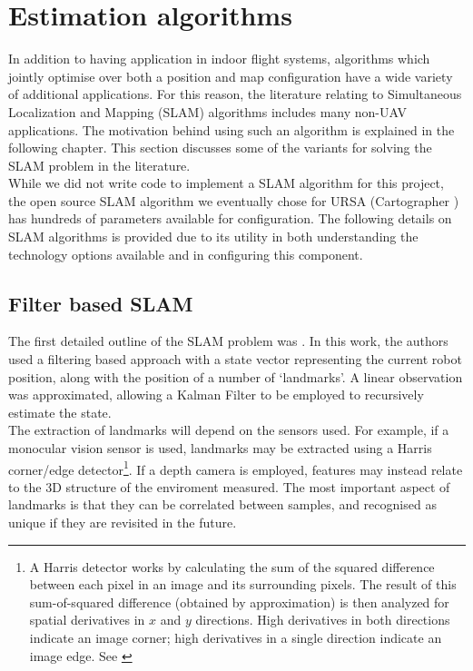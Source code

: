 \documentclass[capstone_report.tex]{subfiles}
\begin{document}
\section{Estimation algorithms}
In addition to having application in indoor flight systems, algorithms which jointly optimise over both a position and map configuration have a wide variety of additional applications. For this reason, the literature relating to Simultaneous Localization and Mapping (SLAM) algorithms includes many non-UAV applications. The motivation behind using such an algorithm is explained in the following chapter. This section discusses some of the variants for solving the SLAM problem in the literature.\\

While we did not write code to implement a SLAM algorithm for this project, the open source SLAM algorithm we eventually chose for URSA (Cartographer \cite{cart}) has hundreds of parameters available for configuration. The following details on SLAM algorithms is provided due to its utility in both understanding the technology options available and in configuring this component.

\subsection{Filter based SLAM}
The first detailed outline of the SLAM problem was \cite{smithcheese}. In this work, the authors used a filtering based approach with a state vector representing the current robot position, along with the position of a number of `landmarks'. A linear observation was approximated, allowing a Kalman Filter to be employed to recursively estimate the state.\\

The extraction of landmarks will depend on the sensors used. For example, if a monocular vision sensor is used, landmarks may be extracted using a Harris corner/edge detector\footnote{A Harris detector works by calculating the sum of the squared difference between each pixel in an image and its surrounding pixels. The result of this sum-of-squared difference (obtained by approximation) is then analyzed for spatial derivatives in $x$ and $y$ directions. High derivatives in both directions indicate an image corner; high derivatives in a single direction indicate an image edge. See \cite{harris}}. If a depth camera is employed, features may instead relate to the 3D structure of the enviroment measured. The most important aspect of landmarks is that they can be correlated between samples, and recognised as unique if they are revisited in the future.
\end{document}
